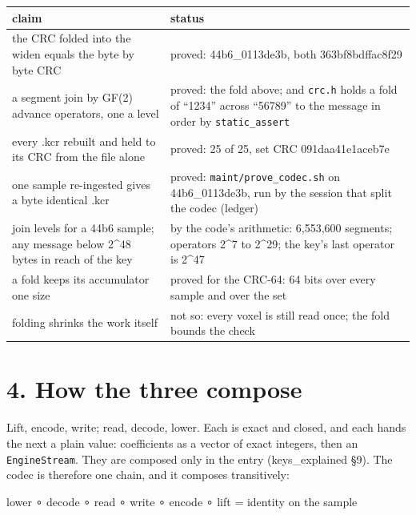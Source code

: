 {\small
\setlength{\tabcolsep}{6pt}
\begin{longtable}{>{\RaggedRight\arraybackslash}p{}>{\RaggedRight\arraybackslash}p{}}
\toprule
claim & status \\
\midrule
\endhead
the CRC folded into the widen equals the byte by byte CRC & proved: 44b6\_\allowbreak{}0113de3b, both 363bf8bdffac8f29 \\
a segment join by GF(2) advance operators, one a level & proved: the fold above; and \texttt{crc.\allowbreak{}h} holds a fold of “1234” across “56789” to the message in order by \texttt{static\_\allowbreak{}assert} \\
every .kcr rebuilt and held to its CRC from the file alone & proved: 25 of 25, set CRC 091daa41e1aceb7e \\
one sample re-ingested gives a byte identical .kcr & proved: \texttt{maint/\allowbreak{}prove\_\allowbreak{}codec.\allowbreak{}sh} on 44b6\_\allowbreak{}0113de3b, run by the session that split the codec (ledger) \\
23 join levels for a 44b6 sample; any message below 2\textasciicircum{}48 bytes in reach of the key & by the code's arithmetic: 6,553,600 segments; operators 2\textasciicircum{}7 to 2\textasciicircum{}29; the key's last operator is 2\textasciicircum{}47 \\
a fold keeps its accumulator one size & proved for the CRC-64: 64 bits over every sample and over the set \\
folding shrinks the work itself & not so: every voxel is still read once; the fold bounds the check \\
\bottomrule
\end{longtable}
}

\section{\texorpdfstring{4. How the three compose}{4. How the three compose}}

Lift, encode, write; read, decode, lower. Each is exact and closed, and each hands the next a plain value: coefficients as a vector of exact integers, then an \texttt{Engine\allowbreak{}Stream}. They are composed only in the entry (keys\_\allowbreak{}explained §9). The codec is therefore one chain, and it composes transitively:

lower ∘ decode ∘ read ∘ write ∘ encode ∘ lift  =  identity on the sample

